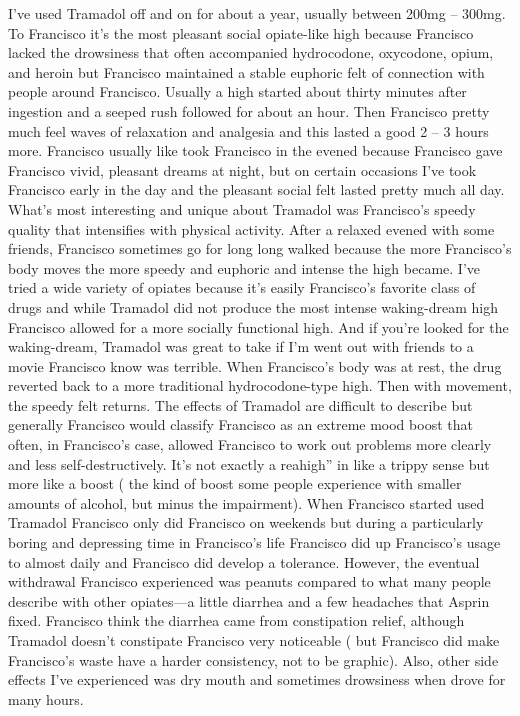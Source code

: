 \documentclass[12pt]{book}
\begin{document}
I've used Tramadol off and on for about a year, usually between 200mg -- 300mg. To Francisco it's the most pleasant social opiate-like high because Francisco lacked the drowsiness that often accompanied hydrocodone, oxycodone, opium, and heroin but Francisco maintained a stable euphoric felt of connection with people around Francisco. Usually a high started about thirty minutes after ingestion and a seeped rush followed for about an hour. Then Francisco pretty much feel waves of relaxation and analgesia and this lasted a good 2 -- 3 hours more. Francisco usually like took Francisco in the evened because Francisco gave Francisco vivid, pleasant dreams at night, but on certain occasions I've took Francisco early in the day and the pleasant social felt lasted pretty much all day. What's most interesting and unique about Tramadol was Francisco's speedy quality that intensifies with physical activity. After a relaxed evened with some friends, Francisco sometimes go for long long walked because the more Francisco's body moves the more speedy and euphoric and intense the high became. I've tried a wide variety of opiates because it's easily Francisco's favorite class of drugs and while Tramadol did not produce the most intense waking-dream high Francisco allowed for a more socially functional high. And if you're looked for the waking-dream, Tramadol was great to take if I'm went out with friends to a movie Francisco know was terrible. When Francisco's body was at rest, the drug reverted back to a more traditional hydrocodone-type high. Then with movement, the speedy felt returns. The effects of Tramadol are difficult to describe but generally Francisco would classify Francisco as an extreme mood boost that often, in Francisco's case, allowed Francisco to work out problems more clearly and less self-destructively. It's not exactly a reahigh'' in like a trippy sense but more like a boost ( the kind of boost some people experience with smaller amounts of alcohol, but minus the impairment). When Francisco started used Tramadol Francisco only did Francisco on weekends but during a particularly boring and depressing time in Francisco's life Francisco did up Francisco's usage to almost daily and Francisco did develop a tolerance. However, the eventual withdrawal Francisco experienced was peanuts compared to what many people describe with other opiates---a little diarrhea and a few headaches that Asprin fixed. Francisco think the diarrhea came from constipation relief, although Tramadol doesn't constipate Francisco very noticeable ( but Francisco did make Francisco's waste have a harder consistency, not to be graphic). Also, other side effects I've experienced was dry mouth and sometimes drowsiness when drove for many hours.
\end{document}
